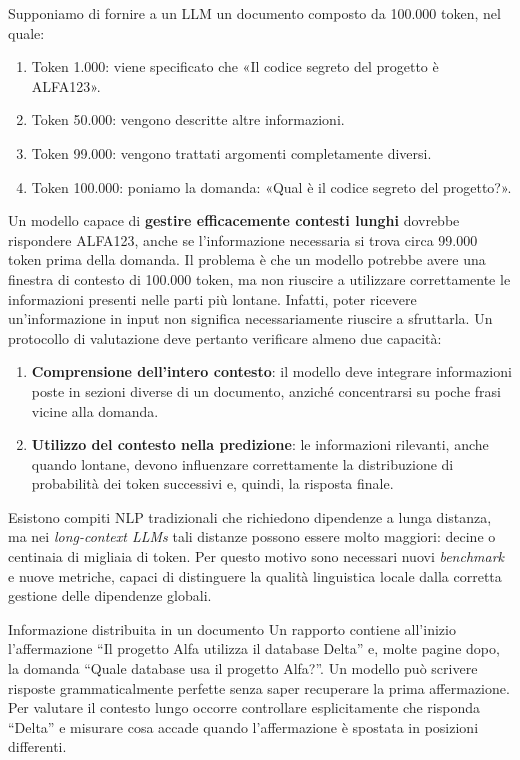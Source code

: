 Supponiamo di fornire a un LLM un documento composto da 100.000 token, nel quale:
\begin{enumerate}
    \item Token 1.000: viene specificato che «Il codice segreto del progetto è ALFA123».
    \item Token 50.000: vengono descritte altre informazioni.
    \item Token 99.000: vengono trattati argomenti completamente diversi.
    \item Token 100.000: poniamo la domanda: «Qual è il codice segreto del progetto?».
\end{enumerate}
Un modello capace di \textbf{gestire efficacemente contesti lunghi} dovrebbe rispondere ALFA123, anche se l'informazione necessaria si trova circa 99.000 token prima della domanda.
Il problema è che un modello potrebbe avere una finestra di contesto di 100.000 token, ma non riuscire a utilizzare correttamente le informazioni presenti nelle parti più lontane.
Infatti, poter ricevere un'informazione in input non significa necessariamente riuscire a sfruttarla.
Un protocollo di valutazione deve pertanto verificare almeno due capacità:
\begin{enumerate}
    \item \textbf{Comprensione dell'intero contesto}: il modello deve integrare informazioni poste in sezioni diverse di un documento, anziché concentrarsi su poche frasi vicine alla domanda.
    \item \textbf{Utilizzo del contesto nella predizione}: le informazioni rilevanti, anche quando lontane, devono influenzare correttamente la distribuzione di probabilità dei token successivi e, quindi, la risposta finale.
\end{enumerate}

Esistono compiti NLP tradizionali che richiedono dipendenze a lunga distanza, ma nei \emph{long-context LLMs} tali distanze possono essere molto maggiori: decine o centinaia di migliaia di token. Per questo motivo sono necessari nuovi \emph{benchmark} e nuove metriche, capaci di distinguere la qualità linguistica locale dalla corretta gestione delle dipendenze globali.

\begin{example}{Informazione distribuita in un documento}
Un rapporto contiene all'inizio l'affermazione ``Il progetto Alfa utilizza il database Delta'' e, molte pagine dopo, la domanda ``Quale database usa il progetto Alfa?''. Un modello può scrivere risposte grammaticalmente perfette senza saper recuperare la prima affermazione. Per valutare il contesto lungo occorre controllare esplicitamente che risponda ``Delta'' e misurare cosa accade quando l'affermazione è spostata in posizioni differenti.
\end{example}

